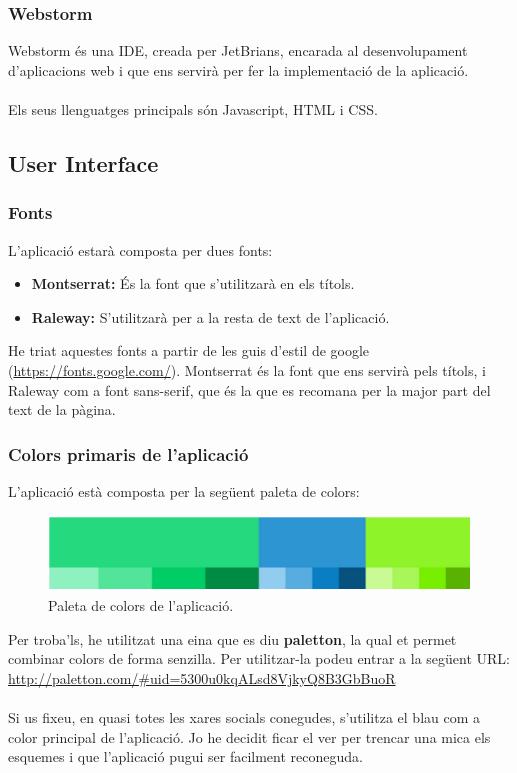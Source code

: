 \documentclass[11pt,catalan,listoffigures,listoftables]{tfgetsinf}
\begin{document}
\subsubsection{Webstorm}

Webstorm és una IDE, creada per JetBrians, encarada al desenvolupament d'aplicacions web i que ens servirà per fer la implementació de la aplicació.\\ \\
Els seus llenguatges principals són Javascript, HTML i CSS.

\subsection{User Interface}

\subsubsection{Fonts}

L'aplicació estarà composta per dues fonts:
\begin{itemize}
\item \textbf{Montserrat:} És la font que s'utilitzarà en els títols.
\item \textbf{Raleway:} S'utilitzarà per a la resta de text de l'aplicació.
\end{itemize}
He triat aquestes fonts a partir de les guis d'estil de google (\url{https://fonts.google.com/}). Montserrat és la font que ens servirà pels títols, i Raleway com a font sans-serif, que és la que es recomana per la major part del text de la pàgina.

\subsubsection{Colors primaris de l'aplicació}

L'aplicació està composta per la següent paleta de colors:

\begin{figure}[h]
\includegraphics[width=12cm]{images/image1}
\centering
\caption[Figura 4.2]{Paleta de colors de l'aplicació.}
\centering
\end{figure}
Per troba'ls, he utilitzat una eina que es diu \textbf{paletton}, la qual et permet combinar colors de forma senzilla. Per utilitzar-la podeu entrar a la següent URL:\\
\url{http://paletton.com/\#uid=5300u0kqALsd8VjkyQ8B3GbBuoR} \\ \\
Si us fixeu, en quasi totes les xares socials conegudes, s'utilitza el blau com a color principal de l'aplicació. Jo he decidit ficar el ver per trencar una mica els esquemes i que l'aplicació pugui ser facilment reconeguda.
\end{document}
